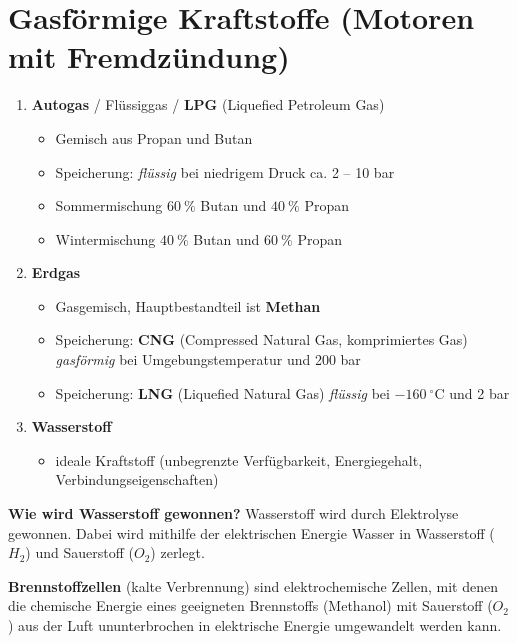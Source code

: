 \section{Gasförmige Kraftstoffe (Motoren mit
Fremdzündung)}\label{gasfoermige-kraftstoffe-motoren-mit-fremdzuendung}

\begin{enumerate}
\item
  \textbf{Autogas} / Flüssiggas / \textbf{LPG} (Liquefied Petroleum Gas)

  \begin{itemize}
  \item
    Gemisch aus Propan und Butan
  \item
    Speicherung: \emph{flüssig} bei niedrigem Druck ca. 2 -- 10 bar
  \item
    Sommermischung $60~\%$ Butan und $40~\%$ Propan
  \item
    Wintermischung $40~\%$ Butan und $60~\%$ Propan
  \end{itemize}
\item
  \textbf{Erdgas}

  \begin{itemize}
  \item
    Gasgemisch, Hauptbestandteil ist \textbf{Methan}
  \item
    Speicherung: \textbf{CNG} (Compressed Natural Gas, komprimiertes
    Gas) \emph{gasförmig} bei Umgebungstemperatur und 200 bar
  \item
    Speicherung: \textbf{LNG} (Liquefied Natural Gas) \emph{flüssig} bei
    $- 160~^\circ\text{C}$ und 2 bar
  \end{itemize}
\item
  \textbf{Wasserstoff}

  \begin{itemize}
  \item
    ideale Kraftstoff (unbegrenzte Verfügbarkeit, Energiegehalt,
    Verbindungseigenschaften)
  \end{itemize}
\end{enumerate}

\textbf{Wie wird Wasserstoff gewonnen?} Wasserstoff wird durch
Elektrolyse gewonnen. Dabei wird mithilfe der elektrischen Energie
Wasser in Wasserstoff ($H_2$) und Sauerstoff ($O_2$) zerlegt.

\textbf{Brennstoffzellen} (kalte Verbrennung) sind elektrochemische
Zellen, mit denen die chemische Energie eines geeigneten Brennstoffs
(Methanol) mit Sauerstoff ($O_2$) aus der Luft ununterbrochen in
elektrische Energie umgewandelt werden kann.

